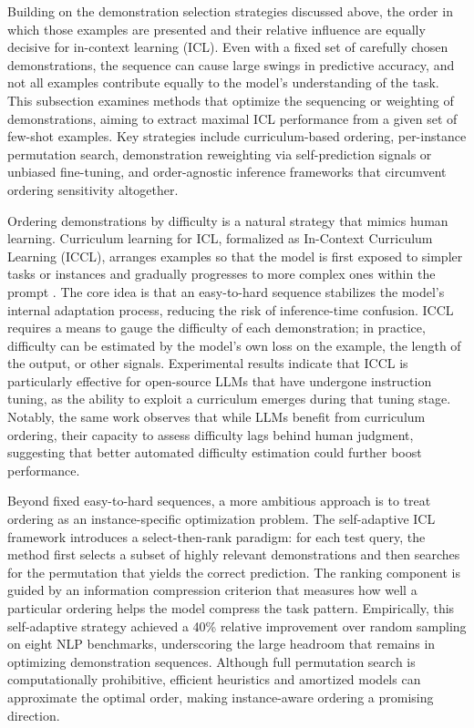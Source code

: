 \documentclass[11pt]{article}
\begin{document}
Building on the demonstration selection strategies discussed above, the order in which those examples are presented and their relative influence are equally decisive for in-context learning (ICL). Even with a fixed set of carefully chosen demonstrations, the sequence can cause large swings in predictive accuracy, and not all examples contribute equally to the model's understanding of the task. This subsection examines methods that optimize the sequencing or weighting of demonstrations, aiming to extract maximal ICL performance from a given set of few-shot examples. Key strategies include curriculum-based ordering, per-instance permutation search, demonstration reweighting via self-prediction signals or unbiased fine-tuning, and order-agnostic inference frameworks that circumvent ordering sensitivity altogether.

Ordering demonstrations by difficulty is a natural strategy that mimics human learning. Curriculum learning for ICL, formalized as In-Context Curriculum Learning (ICCL), arranges examples so that the model is first exposed to simpler tasks or instances and gradually progresses to more complex ones within the prompt \cite{ref77}. The core idea is that an easy-to-hard sequence stabilizes the model's internal adaptation process, reducing the risk of inference-time confusion. ICCL requires a means to gauge the difficulty of each demonstration; in practice, difficulty can be estimated by the model's own loss on the example, the length of the output, or other signals. Experimental results indicate that ICCL is particularly effective for open-source LLMs that have undergone instruction tuning, as the ability to exploit a curriculum emerges during that tuning stage. Notably, the same work observes that while LLMs benefit from curriculum ordering, their capacity to assess difficulty lags behind human judgment, suggesting that better automated difficulty estimation could further boost performance.

Beyond fixed easy-to-hard sequences, a more ambitious approach is to treat ordering as an instance-specific optimization problem. The self-adaptive ICL framework \cite{ref78} introduces a select-then-rank paradigm: for each test query, the method first selects a subset of highly relevant demonstrations and then searches for the permutation that yields the correct prediction. The ranking component is guided by an information compression criterion that measures how well a particular ordering helps the model compress the task pattern. Empirically, this self-adaptive strategy achieved a 40\% relative improvement over random sampling on eight NLP benchmarks, underscoring the large headroom that remains in optimizing demonstration sequences. Although full permutation search is computationally prohibitive, efficient heuristics and amortized models can approximate the optimal order, making instance-aware ordering a promising direction.
\end{document}

